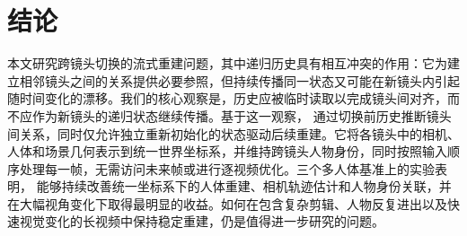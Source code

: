 \FloatBarrier
\section{结论}

本文研究跨镜头切换的流式重建问题，其中递归历史具有相互冲突的作用：它为建立相邻镜头之间的关系提供必要参照，但持续传播同一状态又可能在新镜头内引起随时间变化的漂移。我们的核心观察是，历史应被临时读取以完成镜头间对齐，而不应作为新镜头的递归状态继续传播。基于这一观察，\method{} 通过切换前历史推断镜头间关系，同时仅允许独立重新初始化的状态驱动后续重建。它将各镜头中的相机、人体和场景几何表示到统一世界坐标系，并维持跨镜头人物身份，同时按照输入顺序处理每一帧，无需访问未来帧或进行逐视频优化。三个多人体基准上的实验表明，\method{} 能够持续改善统一坐标系下的人体重建、相机轨迹估计和人物身份关联，并在大幅视角变化下取得最明显的收益。如何在包含复杂剪辑、人物反复进出以及快速视觉变化的长视频中保持稳定重建，仍是值得进一步研究的问题。
